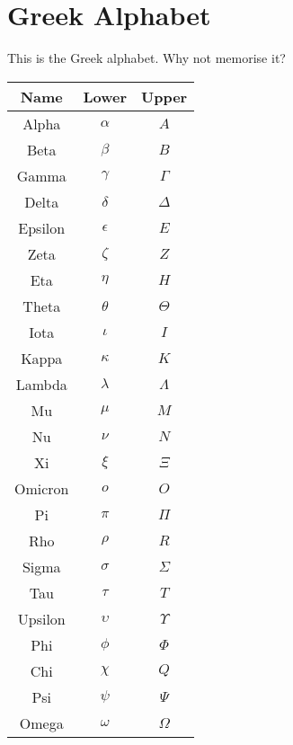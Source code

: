 \chapter{Greek Alphabet}

This is the Greek alphabet. Why not memorise it?

\begin{center}
    \begin{tabular}{ c|c|c }
        Name    & Lower      & Upper      \\
        \hline
        Alpha   & $\alpha$   & $A$        \\
        Beta    & $\beta$    & $B$        \\
        Gamma   & $\gamma$   & $\Gamma$   \\
        Delta   & $\delta$   & $\Delta$   \\
        Epsilon & $\epsilon$ & $E$        \\
        Zeta    & $\zeta$    & $Z$        \\
        Eta     & $\eta$     & $H$        \\
        Theta   & $\theta$   & $\Theta$   \\
        Iota    & $\iota$    & $I$        \\
        Kappa   & $\kappa$   & $K$        \\
        Lambda  & $\lambda$  & $\Lambda$  \\
        Mu      & $\mu$      & $M$        \\
        Nu      & $\nu$      & $N$        \\
        Xi      & $\xi$      & $\Xi$      \\ 
        Omicron & $o$        & $O$        \\
        Pi      & $\pi$      & $\Pi$      \\
        Rho     & $\rho$     & $R$        \\
        Sigma   & $\sigma$   & $\Sigma$   \\
        Tau     & $\tau$     & $T$        \\
        Upsilon & $\upsilon$ & $\Upsilon$ \\
        Phi     & $\phi$     & $\Phi$     \\
        Chi     & $\chi$     & $Q$        \\
        Psi     & $\psi$     & $\Psi$     \\
        Omega   & $\omega$   & $\Omega$        
    \end{tabular}
\end{center}

